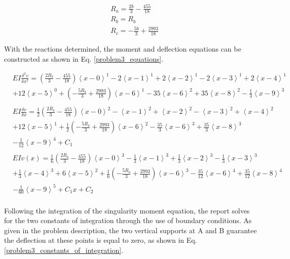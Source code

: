 \documentclass[a4paper]{article}
\begin{document}
\begin{equation}
\begin{split}
	& R_a = \frac{2b}{3} - \frac{455}{18} \\
	& R_b = R_b \\
	& R_c = -\frac{5b}{3} + \frac{2993}{18}
\end{split}
\label{problem3_reaction_solution}
\end{equation}

With the reactions determined, the moment and deflection equations can be constructed as shown in Eq. \ref{problem3_equations}.

\begin{equation}
    \begin{split}
& EI \frac{\delta^2 v}{\delta x^2} = \left(\frac{2R_b}{3} - \frac{455}{18}\right)\left<x-0\right>^1 - 2\left<x-1\right>^1 +  2\left<x-2\right>^1 - 2\left<x-3\right>^1 +  2\left<x-4\right>^1 \\
& + 12\left<x-5\right>^0 + \left(-\frac{5R_b}{3} + \frac{2993}{18}\right)\left<x-6\right>^1 - 35\left<x-6\right>^2 + 35\left<x-8\right>^2  - \frac{1}{3}\left<x-9\right>^3 \\
& \\
& EI \frac{\delta v}{\delta x} = \frac{1}{2}\left(\frac{2R_b}{3} - \frac{455}{18}\right)\left<x-0\right>^2 - \left<x-1\right>^2 +  \left<x-2\right>^2 - \left<x-3\right>^2 +  \left<x-4\right>^2 \\
& + 12\left<x-5\right>^1 + \frac{1}{2}\left(-\frac{5R_b}{3} + \frac{2993}{18}\right)\left<x-6\right>^2 -  \frac{35}{3}\left<x-6\right>^3 + \frac{35}{3}\left<x-8\right>^3  \\
& - \frac{1}{12}\left<x-9\right>^4 + C_1 \\
& \\
& EI v(x) =\frac{1}{6}\left(\frac{2R_b}{3} - \frac{455}{18}\right)\left<x-0\right>^3 - \frac{1}{3}\left<x-1\right>^3 +  \frac{1}{3}\left<x-2\right>^3 - \frac{1}{3}\left<x-3\right>^3 \\
& +  \frac{1}{3}\left<x-4\right>^3 + 6\left<x-5\right>^2 + \frac{1}{6}\left(-\frac{5R_b}{3} + \frac{2993}{18}\right)\left<x-6\right>^3 -  \frac{35}{12}\left<x-6\right>^4 + \frac{35}{12}\left<x-8\right>^4  \\
& - \frac{1}{60}\left<x-9\right>^5 + C_1x + C_2 \\
\end{split}
\label{problem3_equations}
\end{equation}

Following the integration of the singularity moment equation, the report solves for the two constants of integration through the use of boundary conditions. As given in the problem description, the two vertical supports at A and B guarantee the deflection at these points is equal to zero, as shown in Eq. \ref{problem3_constants_of_integration}.
\end{document}
